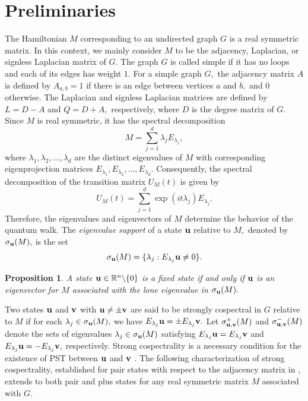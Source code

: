\documentclass[12pt,a4paper]{article}
\newtheorem{prop}{Proposition}
\def \u {{\bf u}}
\def \v {{\bf v}}
\begin{document}
\section{Preliminaries}\label{6s2}
The Hamiltonian $M$ corresponding to an undirected graph $G$ is a real symmetric matrix. In this context, we mainly consider $M$ to be the adjacency, Laplacian, or signless Laplacian matrix of $G.$
The graph $G$ is called simple if it has no loops and each of its edges has weight $1.$ For a simple graph $G,$ the adjacency matrix $A$ is defined by $A_{a,b}=1$ if there is an edge between vertices $a$ and $b,$ and $0$ otherwise. The Laplacian and signless Laplacian matrices are defined by $L=D-A$ and $Q=D+A,$ respectively, where $D$ is the degree matrix of $G.$ Since $M$ is real symmetric, it has the spectral decomposition 
   \[M=\sum_{j=1}^{d}\lambda_jE_{\lambda_j},\]
   where $\lambda_1,\lambda_2,\ldots,\lambda_d$ are the distinct eigenvalues of $M$ with corresponding eigenprojection matrices $E_{\lambda_1},E_{\lambda_2},\ldots,E_{\lambda_d}.$ Consequently, the spectral decomposition of the transition matrix $U_M(t)$ is given by
   \[U_M(t)=\sum_{j=1}^{d}\exp{(it\lambda_j)}E_{\lambda_j}.\]
   Therefore, the eigenvalues and eigenvectors of $M$ determine the behavior of the quantum walk. The \emph{eigenvalue support} of a state $\u$ relative to $M,$ denoted by $\sigma_\u(M),$ is the set 
   \[\sigma_\u(M)=\{\lambda_j:E_{\lambda_j}\u\neq 0\}.\]
   \begin{prop}\cite{god7}
    A state $\u\in\mathbb{R}^n\backslash\{0\}$ is a fixed state if and only if $\u$ is an eigenvector for $M$ associated with the lone eigenvalue in $\sigma_\u(M).$
\end{prop}

Two states $\u$ and $\v$ with $\u\neq \pm\v$ are said to be strongly cospectral in $G$ relative to $M$ if 
for each $\lambda_j\in\sigma_{\u}(M),$ we have
$E_{\lambda_j}\u= \pm E_{\lambda_j}\v.$ Let $\sigma_{\u,\v}^+(M)$ and $\sigma_{\u,\v}^-(M)$ denote the sets of eigenvalues $\lambda_j\in\sigma_{\u}(M)$ satisfying $E_{\lambda_j}\u= E_{\lambda_j}\v$ and  $E_{\lambda_j}\u=- E_{\lambda_j}\v,$ respectively. Strong cospectrality is a necessary condition for the existence of PST between $\u$ and $\v$ \cite[Lemma 5.1]{god7}. The following characterization of strong cospectrality, established for pair states with respect to the adjacency matrix in \cite[Proposition 4.1]{saro}, extends to both pair and plus states for any real symmetric matrix $M$ associated with $G.$
\end{document}
